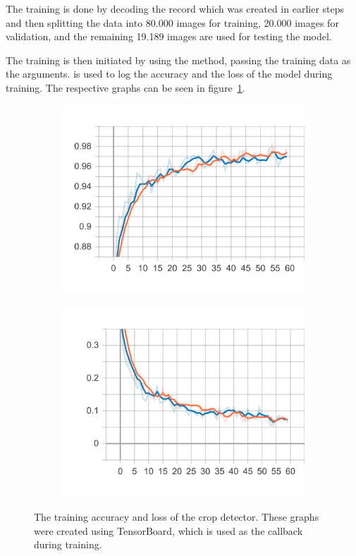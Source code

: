 The training is done by decoding the record which was created in earlier steps and then splitting the data into 80.000 images for training, 20.000 images for validation, and the remaining 19.189 images are used for testing the model.

The training is then initiated by using the  method, passing the training data as the arguments.
is used to log the accuracy and the loss of the model during training.
The respective graphs can be seen in figure~\ref{fig:crop_detector_tensorboard}.

\begin{figure}
    \centering
    \begin{subfigure}[b]{0.45\textwidth}
        \includegraphics[width=\textwidth]{images/crop_detector_epoch_acc.png}
    \end{subfigure}
    \begin{subfigure}[b]{0.45\textwidth}
        \includegraphics[width=\textwidth]{images/crop_detector_epoch_loss.png}
    \end{subfigure}
    \caption[TensorBoard output for the crop detector]{The training accuracy and loss of the crop detector. These graphs were created using TensorBoard, which is used as the callback during training.}\label{fig:crop_detector_tensorboard}
\end{figure}

